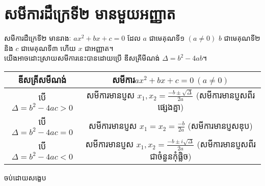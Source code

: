 \section{សមីការដឺក្រេទី២ មានមួយអញ្ញាត}
សមីការដឺក្រេទី២ មានរាងៈ $ax^{2}+bx+c=0$ ដែល $a$ ជាមេគុណទី១ $\left(a\ne0\right)$ $b$ ជាមេគុណទី២ និង $c$ ជាមេគុណទី៣ ហើយ $x$ ជាអញ្ញាត។\\
យើងអាចដោះស្រាយសមីការនេះបានដោយប្រើ ឌីសគ្រីមីណង់ $\Delta=b^{2}-4ab$។
\begin{center}
	\begin{tabular}{| c | c |}
		\hline
		 ឌីសគ្រីសមីណង់ & សមីការ​ $ax^{2}+bx+c=0~\left(a\ne 0\right)$ \\ \hline
		 បើ​ $\Delta = b^{2}-4ac>0$ & សមីការមានប្ញស $x_{1}, x_{2}=\frac{-b\pm\sqrt{\Delta}}{2a}$ (សមីការមានប្ញសពីរផ្សេងគ្នា) \\ \hline
		 បើ​ $\Delta = b^{2}-4ac=0$ & សមីការមានប្ញស $x_{1}= x_{2}=\frac{-b}{2a}$ (សមីការមានប្ញសឌុប) \\ \hline
		 បើ $\Delta = b^{2}-4ac<0$ & សមីការមានប្ញស $x_{1}, x_{2}=\frac{-b\pm i\sqrt{\Delta}}{2a}$ (សមីការមានប្ញសពីរជាចំនួនកុំផ្លិច) \\ 
		 \hline
	\end{tabular}
\end{center}
\begin{center}
	{\kml \Large \color{ magenta}ចប់ដោយសង្ខេប}
\end{center}